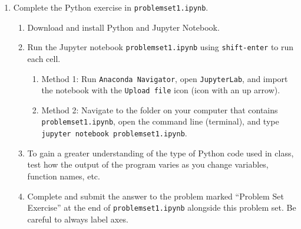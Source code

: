 \documentclass{article}
\begin{document}
\begin{enumerate}[label=\textbf{\arabic*.}]
    \item Complete the Python exercise in \texttt{problemset1.ipynb}.
    \begin{enumerate}[label=\textbf{(\alph*)}]
        \item Download and install Python and Jupyter Notebook.
        \item Run the Jupyter notebook \texttt{problemset1.ipynb} using \texttt{shift-enter} to run each cell.
        \begin{enumerate}[label=\textbf{\roman*.}]
            \item Method 1: Run \texttt{Anaconda Navigator}, open \texttt{JupyterLab}, and import the notebook with the \texttt{Upload file} icon (icon with an up arrow).
            \item Method 2: Navigate to the folder on your computer that contains \texttt{problemset1.ipynb}, open the command line (terminal), and type \texttt{jupyter notebook problemset1.ipynb}.
        \end{enumerate}
        \item To gain a greater understanding of the type of Python code used in class, test how the output of the program varies as you change variables, function names, etc.
        \item Complete and submit the answer to the problem marked “Problem Set Exercise” at the end of \texttt{problemset1.ipynb} alongside this problem set. Be careful to always label axes.
    \end{enumerate}
\end{enumerate}
\end{document}
